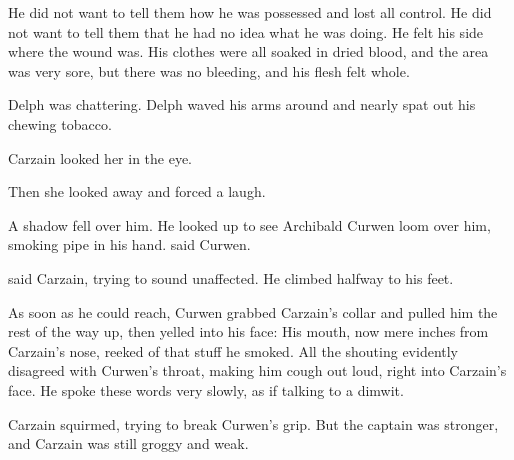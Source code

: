 He did not want to tell them how he was possessed and lost all control. 
He did not want to tell them that he had no idea what he was doing. 
He felt his side where the wound was. 
His clothes were all soaked in dried blood, and the area was very sore, but there was no bleeding, and his flesh felt whole. 

 Delph was chattering. 
Delph waved his arms around and nearly spat out his chewing tobacco.

Carzain looked her in the eye. 

Then she looked away and forced a laugh. 


A shadow fell over him. 
He looked up to see Archibald Curwen loom over him, smoking pipe in his hand. 
 said Curwen.

 said Carzain, trying to sound unaffected. 
He climbed halfway to his feet.

As soon as he could reach, Curwen grabbed Carzain's collar and pulled him the rest of the way up, then yelled into his face: 
His mouth, now mere inches from Carzain's nose, reeked of that stuff he smoked. 
All the shouting evidently disagreed with Curwen's throat, making him cough out loud, right into Carzain's face. 
He spoke these words very slowly, as if talking to a dimwit. 

Carzain squirmed, trying to break Curwen's grip. 
But the captain was stronger, and Carzain was still groggy and weak. 

